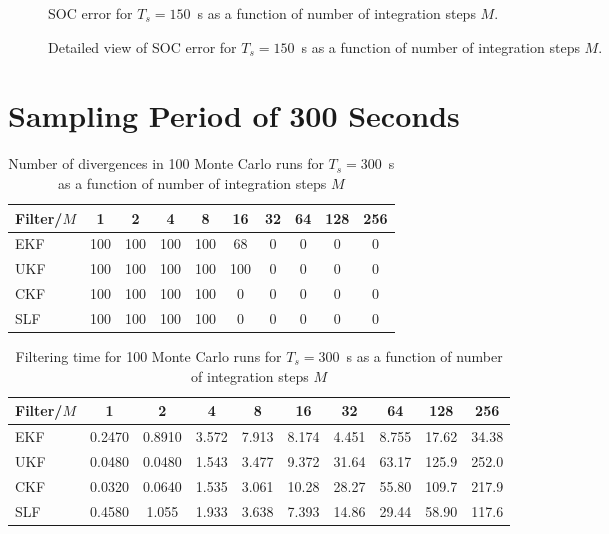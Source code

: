 \documentclass[../zhang_thesis.tex]{subfiles}
\begin{document}
\clearpage

\begin{figure}[p]
\centering

\caption{SOC error for $T_s=150$~s as a function of number of integration steps $M$.}
\label{fig:mrmse_150}
\end{figure}

\begin{figure}[p]
\centering

\caption{Detailed view of SOC error for $T_s=150$~s as a function of number of integration steps $M$.}
\label{fig:mrmse_det_150}
\end{figure}

\clearpage

\section{Sampling Period of 300 Seconds}

\begin{table}[h]
\centering
\caption{Number of divergences in 100 Monte Carlo runs for $T_s=300$~s as a function of number of integration steps $M$}
\begin{tabular}{@{}l*{9}{c}@{}}
\toprule
Filter/$M$ & 1   & 2   & 4   & 8   & 16  & 32 & 64 & 128 & 256 \\
\midrule
EKF        & 100 & 100 & 100 & 100 & 68  & 0  & 0  & 0   & 0   \\
UKF        & 100 & 100 & 100 & 100 & 100 & 0  & 0  & 0   & 0   \\
CKF        & 100 & 100 & 100 & 100 & 0   & 0  & 0  & 0   & 0   \\
SLF        & 100 & 100 & 100 & 100 & 0   & 0  & 0  & 0   & 0   \\
\bottomrule
\end{tabular}
\label{tab:div_300}
\end{table}

\begin{table}[h]
\centering
\caption{Filtering time for 100 Monte Carlo runs for $T_s=300$~s as a function of number of integration steps $M$}
\begin{tabular}{@{}lccccccccc@{}}
\toprule
Filter/$M$ & 1      & 2      & 4     & 8     & 16    & 32    & 64    & 128   & 256   \\ \midrule
EKF        & 0.2470 & 0.8910 & 3.572 & 7.913 & 8.174 & 4.451 & 8.755 & 17.62 & 34.38 \\
UKF        & 0.0480 & 0.0480 & 1.543 & 3.477 & 9.372 & 31.64 & 63.17 & 125.9 & 252.0 \\
CKF        & 0.0320 & 0.0640 & 1.535 & 3.061 & 10.28 & 28.27 & 55.80 & 109.7 & 217.9 \\
SLF        & 0.4580 & 1.055  & 1.933 & 3.638 & 7.393 & 14.86 & 29.44 & 58.90 & 117.6 \\ \bottomrule
\end{tabular}
\label{tab:time_300}
\end{table}
\end{document}

